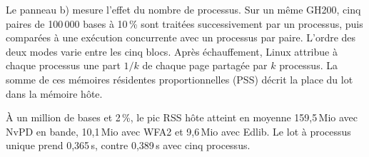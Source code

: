 Le panneau b) mesure l’effet du nombre de processus. Sur un même GH200, cinq paires de 100\,000 bases à 10\,\% sont traitées successivement par un processus, puis comparées à une exécution concurrente avec un processus par paire. L’ordre des deux modes varie entre les cinq blocs. Après échauffement, Linux attribue à chaque processus une part \(1/k\) de chaque page partagée par \(k\) processus. La somme de ces mémoires résidentes proportionnelles (PSS) décrit la place du lot dans la mémoire hôte.

À un million de bases et 2\,\%, le pic RSS hôte atteint en moyenne 159,5\,Mio avec NvPD en bande, 10,1\,Mio avec WFA2 et 9,6\,Mio avec Edlib. Le lot à processus unique prend 0,365\,s, contre 0,389\,s avec cinq processus.

